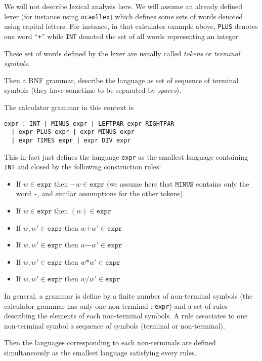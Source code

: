 \documentclass[12pt]{article}
\begin{document}
{We will not describe lexical analysis here. We will assume an already
defined lexer (for instance using \texttt{ocamllex}) which defines 
some sets of words denoted using capital letters. For instance, 
in that calculator example above, \verb#PLUS# denotes one word 
``\verb#+#'' while \verb#INT# denoted the set of all words representing
an integer.

These set of words defined by the lexer are usually called {\em
  tokens} or {\em terminal symbols}.

Then a BNF grammar, describe the language as set of sequence of
terminal symbols 
(they have sometime to be separated by {\em spaces}). 

The calculator grammar in this context is 

\begin{verbatim}
expr : INT | MINUS expr | LEFTPAR expr RIGHTPAR
  | expr PLUS expr | expr MINUS expr 
  | expr TIMES expr | expr DIV expr
\end{verbatim}
 
This in fact just defines the language \texttt{expr} as the smallest language
containing \texttt{INT} and closed by the following construction
rules:
\begin{itemize}
\item If $w \in \mathtt{expr}$ then $\mathtt{-}w \in \mathtt{expr}$ (we assume
  here that $\texttt{MINUS}$ contains only the word \verb#-#, and
  similar assumptions for the other tokens).
\item If $w \in \mathtt{expr}$ then $(w) \in \mathtt{expr}$
\item If $w,w' \in \mathtt{expr}$ then $w\mathtt{+}w' \in \mathtt{expr}$
\item If $w,w' \in \mathtt{expr}$ then $w\mathtt{-}w' \in \mathtt{expr}$
\item If $w,w' \in \mathtt{expr}$ then $w\mathtt{*}w' \in \mathtt{expr}$
\item If $w,w' \in \mathtt{expr}$ then $w\mathtt{/}w' \in \mathtt{expr}$
\end{itemize}

In general, a grammar is define by a finite number of non-terminal
symbols (the calculator grammar has only one non-terminal :
\texttt{expr}) and a set of rules describing the elements of each
non-terminal symbols.  
A rule associates to one non-terminal symbol a sequence of symbols
(terminal or non-terminal). 

Then the languages corresponding to each non-terminals are defined
simultaneously as the smallest language satisfying every rules.

}
\end{document}
